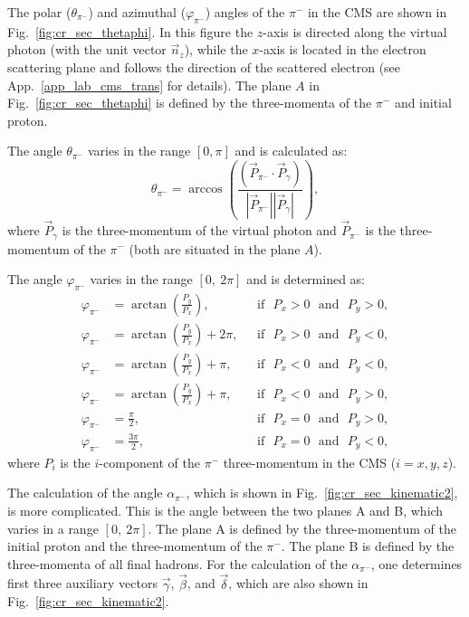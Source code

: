The polar ($\theta_{\pi^{-}}$) and azimuthal ($\varphi_{\pi^{-}}$) angles of the $\pi^{-}$ in the CMS are shown in Fig.~\ref{fig:cr_sec_thetaphi}. In this figure the $z$-axis is directed along the virtual photon (with the unit vector $\vec n_{z}$), while the $x$-axis is located in the electron scattering plane and follows the direction of the scattered electron (see App.~\ref{app_lab_cms_trans} for details). The plane $A$ in Fig.~\ref{fig:cr_sec_thetaphi} is defined by the three-momenta of the $\pi^{-}$ and initial proton.  
	
The angle $\theta_{\pi^{-}}$ varies in the range $[0,\pi]$ and is calculated as:%
\begin{equation}
\theta_{\pi^{-}} = \arccos\left( \frac{(\vec P_{\pi^{-}} \cdot \vec P_{\gamma})}
{|\vec P_{\pi^{-}}| |\vec P_{\gamma}|} \right),
\label{angletheta}
\end{equation} 
where $\vec P_{\gamma}$ is the three-momentum of the virtual photon and $\vec P_{\pi^{-}}$ is the three-momentum of the  $\pi^{-}$ (both are situated in the plane $A$).

The angle $\varphi_{\pi^{-}}$ varies in the range $[0,~2\pi]$ and is determined as:
\begin{equation}
\begin{aligned}
\varphi_{\pi^{-}} &= \arctan\left( \frac{P_{y}}{P_{x}} \right), &\text{~~if~~} P_{x} > 0 \text{~~and~~}  P_{y} > 0, \\
\varphi_{\pi^{-}} &= \arctan\left( \frac{P_{y}}{P_{x}} \right) + 2\pi, &\text{~~if~~}P_{x} > 0 \text{~~and~~}  P_{y} < 0, \\
\varphi_{\pi^{-}} &= \arctan\left( \frac{P_{y}}{P_{x}} \right) + \pi, &\text{~~if~~}P_{x} < 0 \text{~~and~~}  P_{y} < 0, \\
\varphi_{\pi^{-}} &= \arctan\left( \frac{P_{y}}{P_{x}} \right) + \pi, &\text{~~if~~}P_{x} < 0 \text{~~and~~}  P_{y} > 0,  \\
\varphi_{\pi^{-}} &= \frac{\pi}{2}, &\text{~~if~~}P_{x} = 0 \text{~~and~~}  P_{y} > 0,  \\
\varphi_{\pi^{-}} &= \frac{3\pi}{2}, &\text{~~if~~}P_{x} = 0\text{~~and~~}  P_{y} < 0, 
\end{aligned}
\end{equation}
where $P_{i}$ is the $i$-component of the $\pi^{-}$ three-momentum in the CMS ($i = x,y,z$).

The calculation of the angle $\alpha_{\pi^{-}}$, which is shown in Fig.~\ref{fig:cr_sec_kinematic2}, is more complicated. This is the angle between the two planes A and B, which varies in a range $[0,~2\pi]$. The plane A is defined by the three-momentum of the initial proton and the three-momentum of the $\pi^{-}$. The plane B is defined by the three-momenta of all final hadrons. For the calculation of the $\alpha_{\pi^{-}}$, one determines first three auxiliary vectors $\vec \gamma$, $\vec \beta$, and $\vec \delta$, which are also shown in Fig.~\ref{fig:cr_sec_kinematic2}.

